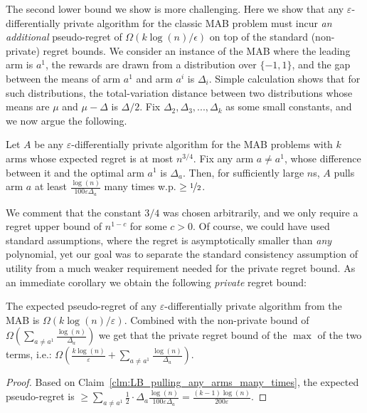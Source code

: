 \documentclass{article}
\begin{document}
The second lower bound we show is more challenging. Here we show that any $\varepsilon$-differentially private algorithm for the classic MAB problem must incur \emph{an additional} pseudo-regret of $\Omega( k\log(n)/\epsilon)$ on top of the standard (non-private) regret bounds.  We consider an instance of the MAB where the leading arm is $a^1$, the rewards are drawn from a distribution over $\{-1,1\}$, and the gap between the means of arm $a^1$ and arm $a^i$ is $\Delta_i$. Simple calculation shows that for such distributions, the total-variation distance between two distributions whose means are $\mu$ and $\mu-\Delta$ is $\Delta/2$. Fix $\Delta_2, \Delta_3,...,\Delta_k$ as some small constants, and we now argue the following.
\begin{claim}
\label{clm:LB_pulling_any_arms_many_times}
Let $A$ be any $\varepsilon$-differentially private algorithm for the MAB problems with $k$ arms whose expected regret is at most $n^{3/4}$. Fix any arm $a\neq a^1$, whose difference between it and the optimal arm $a^1$ is $\Delta_a$. Then, for sufficiently large $n$s, $A$ pulls arm $a$ at least $\tfrac {\log(n)}{100\varepsilon\Delta_a}$ many times w.p. $\geq \nicefrac 1 2$.
\end{claim}
We comment that the constant $3/4$ was chosen arbitrarily, and we only require a regret upper bound of $n^{1-c}$ for some $c>0$. Of course, we could have used standard assumptions, where the regret is asymptotically smaller than \emph{any} polynomial, yet our goal was to separate the standard consistency assumption of utility from a much weaker requirement needed for the private regret bound.
As an immediate corollary we obtain the following \emph{private} regret bound:
\begin{corollary}
\label{cor:LB_private_MAB}
The expected pseudo-regret of any $\varepsilon$-differentially private algorithm from the MAB is $\Omega(k\log(n)/\varepsilon)$. Combined with the non-private bound of $\Omega\left( \sum_{a\neq a^1} \tfrac{\log(n)}{\Delta_a}\right)$ we get that the private regret bound of the $\max$ of the two terms, i.e.: $\Omega\left( \tfrac {k\log(n)}{\varepsilon}+\sum\limits_{a\neq a^1} \tfrac{\log(n)}{\Delta_a}\right)$.
\end{corollary}
\begin{proof}
Based on Claim~\ref{clm:LB_pulling_any_arms_many_times}, the expected pseudo-regret is $\geq \sum\limits_{a\neq a^1} \tfrac 1 2 \cdot \Delta_a \tfrac{\log(n)}{100 \varepsilon\Delta_a} = \tfrac{(k-1)\log(n)}{200\varepsilon}$.
\end{proof}
\end{document}
